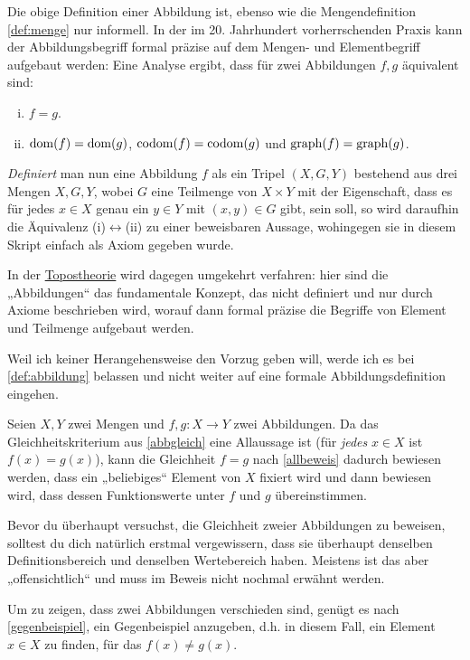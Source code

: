 \begin{vorschau}
    Die obige Definition einer Abbildung ist, ebenso wie die Mengendefinition \cref{def:menge} nur informell. In der im 20. Jahrhundert vorherrschenden Praxis kann der Abbildungsbegriff formal präzise auf dem Mengen- und Elementbegriff aufgebaut werden: Eine Analyse ergibt, dass für zwei Abbildungen $f,g$ äquivalent sind:
    \begin{enumerate}[(i)]
        \item $f=g$.
        \item $\operatorname{dom}(f)=\operatorname{dom}(g)$, $\operatorname{codom}(f)=\operatorname{codom}(g)$ und $\operatorname{graph}(f)=\operatorname{graph}(g)$.
    \end{enumerate}
    \emph{Definiert} man nun eine Abbildung $f$ als ein Tripel $(X,G,Y)$ bestehend aus drei Mengen $X,G,Y$, wobei $G$ eine Teilmenge von $X\times Y$ mit der Eigenschaft, dass es für jedes $x\in X$ genau ein $y\in Y$ mit $(x,y)\in G$ gibt, sein soll, so wird daraufhin die Äquivalenz (i)$\leftrightarrow$(ii) zu einer beweisbaren Aussage, wohingegen sie in diesem Skript einfach als Axiom gegeben wurde.
    
    In der \href{https://en.wikipedia.org/wiki/Topos#Elementary_topoi_(topoi_in_logic)}{Topostheorie} wird dagegen umgekehrt verfahren: hier sind die „Abbildungen“ das fundamentale Konzept, das nicht definiert und nur durch Axiome beschrieben wird, worauf dann formal präzise die Begriffe von Element und Teilmenge aufgebaut werden.
    
    Weil ich keiner Herangehensweise den Vorzug geben will, werde ich es bei \cref{def:abbildung} belassen und nicht weiter auf eine formale Abbildungsdefinition eingehen.
\end{vorschau}


\begin{bem}
    Seien $X,Y$ zwei Mengen und $f,g:X\to Y$ zwei Abbildungen. Da das Gleichheitskriterium aus \cref{abbgleich} eine Allaussage ist (für \emph{jedes} $x\in X$ ist $f(x)=g(x)$), kann die Gleichheit $f=g$ nach \cref{allbeweis} dadurch bewiesen werden, dass ein „beliebiges“ Element von $X$ fixiert wird und dann bewiesen wird, dass dessen Funktionswerte unter $f$ und $g$ übereinstimmen.

    Bevor du überhaupt versuchst, die Gleichheit zweier Abbildungen zu beweisen, solltest du dich natürlich erstmal vergewissern, dass sie überhaupt denselben Definitionsbereich und denselben Wertebereich haben. Meistens ist das aber „offensichtlich“ und muss im Beweis nicht nochmal erwähnt werden.

    Um zu zeigen, dass zwei Abbildungen verschieden sind, genügt es nach \cref{gegenbeispiel}, ein Gegenbeispiel anzugeben, d.h. in diesem Fall, ein Element $x\in X$ zu finden, für das $f(x)\neq g(x)$.
\end{bem}


